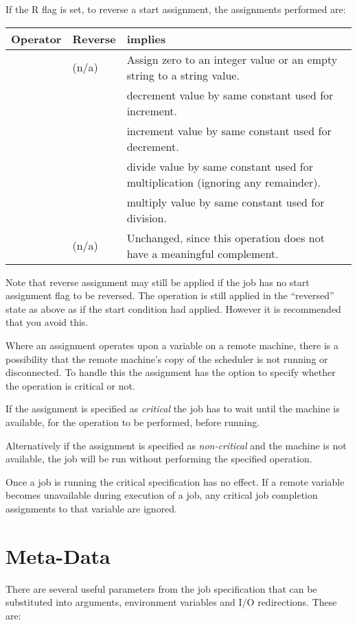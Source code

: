 If the R flag is set, to reverse a start assignment, the assignments performed are:

\begin{center}
\begin{tabular}{|l l p{10cm}|}
\hline
\bfseries Operator &
\bfseries Reverse &
\bfseries implies\\\hline
\exampletext{=} & (n/a) & Assign zero to an integer value or an empty string to a string value.\\
\exampletext{+=} & \exampletext{{}-=} & decrement value by same constant used for increment.\\
\exampletext{{}-=} & \exampletext{+=} & increment value by same constant used for decrement.\\
\exampletext{*=} & \exampletext{/=} & divide value by same constant used for multiplication (ignoring any remainder).\\
\exampletext{/=} & \exampletext{*=} & multiply value by same constant used for division.\\
\exampletext{\%=} & (n/a) & Unchanged, since this operation does not have a meaningful complement.\\\hline
\end{tabular}
\end{center}
Note that reverse assignment may still be applied if the job has no start assignment flag to be reversed. The operation is still applied in
the ``reversed'' state as above as if the start condition had applied. However it is recommended that you avoid
this.

Where an assignment operates upon a variable on a remote machine, there is a possibility that the remote machine's copy of the
scheduler is not running or disconnected. To handle this the assignment has the option to specify whether the operation is critical or not.

If the assignment is specified as \textit{critical} the job has to wait until the machine is available, for the operation to be performed,
before running.

Alternatively if the assignment is specified as \textit{non-critical} and the machine is not available, the job will be run without
performing the specified operation.

Once a job is running the critical specification has no effect. If a remote variable becomes unavailable during execution of a job, any
critical job completion assignments to that variable are ignored.

\section{Meta-Data}
\label{bkm:Metadata}There are several useful parameters from the job specification that can be substituted into arguments, environment
variables and I/O redirections. These are:

